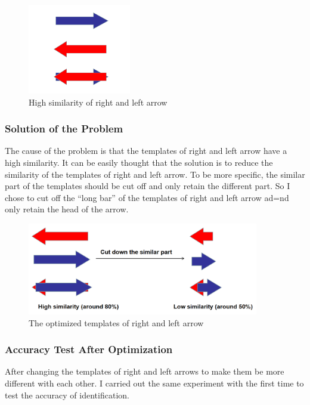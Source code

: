 \documentclass[12pt, a4paper, oneside]{report}
\begin{document}
\begin{figure}[H]
  \centering
  \includegraphics[width=0.4\textwidth]{pic/Arrow Rec/4.png}
  \caption{High similarity of right and left arrow}
  \label{fig:High similarity of right and left arrow}
\end{figure}

\subsubsection{Solution of the Problem}
The cause of the problem is that the templates of right and left arrow have a high similarity. It can be easily thought that the solution is to reduce the similarity of the templates of right and left arrow. To be more specific, the similar part of the templates should be cut off and only retain the different part. So I chose to cut off the “long bar” of the templates of right and left arrow ad=nd only retain the head of the arrow.

\begin{figure}[H]
  \centering
  \includegraphics[width=0.9\textwidth]{pic/Arrow Rec/5.png}
  \caption{The optimized templates of right and left arrow}
  \label{fig:The optimized templates of right and left arrow}
\end{figure}

\subsubsection{Accuracy Test After Optimization}
After changing the templates of right and left arrows to make them be more different with each other. I carried out the same experiment with the first time to test the accuracy of identification.
\end{document}
